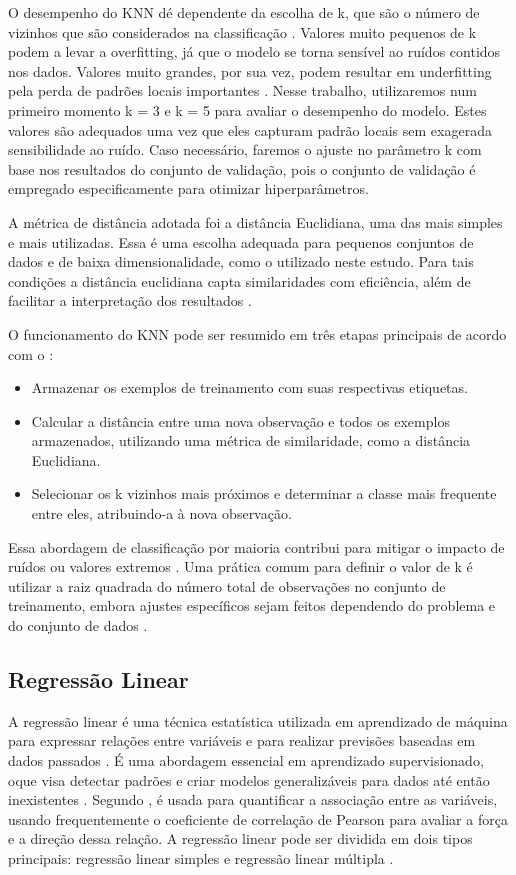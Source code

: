 O desempenho do KNN dé dependente da escolha de k, que são o número de vizinhos que são considerados na classificação \cite{zhang2016}. Valores muito pequenos de k podem a levar a overfitting, já que o modelo se torna sensível ao ruídos contidos nos dados. Valores muito grandes, por sua vez, podem resultar em underfitting pela perda de padrões locais importantes \cite{elkan2011}. Nesse trabalho, utilizaremos num primeiro momento k = 3 e k = 5 para avaliar o desempenho do modelo. Estes valores são adequados uma vez que eles capturam padrão locais sem exagerada sensibilidade ao ruído. Caso necessário, faremos o ajuste no parâmetro k com base nos resultados do conjunto de validação, pois o conjunto de validação é empregado especificamente para otimizar hiperparâmetros.

A métrica de distância adotada foi a distância Euclidiana, uma das mais simples e mais utilizadas. Essa é uma escolha adequada para pequenos conjuntos de dados e de baixa dimensionalidade, como o utilizado neste estudo. Para tais condições a distância euclidiana capta similaridades com eficiência, além de facilitar a interpretação dos resultados \cite{elkan2011}.

O funcionamento do KNN pode ser resumido em três etapas principais de acordo com o :
\begin{itemize}
    \item Armazenar os exemplos de treinamento com suas respectivas etiquetas.
    \item Calcular a distância entre uma nova observação e todos os exemplos armazenados, utilizando uma métrica de similaridade, como a distância Euclidiana.
    \item Selecionar os k vizinhos mais próximos e determinar a classe mais frequente entre eles, atribuindo-a à nova observação.
\end{itemize}

Essa abordagem de classificação por maioria contribui para mitigar o impacto de ruídos ou valores extremos \cite{elkan2011}. Uma prática comum para definir o valor de k é utilizar a raiz quadrada do número total de observações no conjunto de treinamento, embora ajustes específicos sejam feitos dependendo do problema e do conjunto de dados \cite{elkan2011}.

\subsection{Regressão Linear}
A regressão linear é uma técnica estatística utilizada em aprendizado de máquina para expressar relações entre variáveis e para realizar previsões baseadas em dados passados \cite{rodrigues}. É uma abordagem essencial em aprendizado supervisionado, oque visa detectar padrões e criar modelos generalizáveis para dados até então inexistentes \cite{soto}. Segundo ,  é usada para quantificar a associação entre as variáveis, usando frequentemente o coeficiente de correlação de Pearson para avaliar a força e a direção dessa relação. A regressão linear pode ser dividida em dois tipos principais: regressão linear simples e regressão linear múltipla \cite{soto}.

